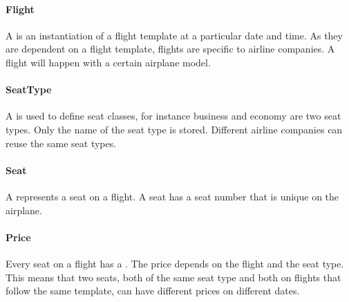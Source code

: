 \documentclass[a4paper]{article}
\begin{document}


\paragraph{Flight}
A  is an instantiation of a flight template at a particular date and time.
As they are dependent on a flight template, flights are specific to airline companies.
A flight will happen with a certain airplane model.
\paragraph{SeatType}
A  is used to define seat classes, for instance business and economy are two seat types.
Only the name of the seat type is stored.
Different airline companies can reuse the same seat types.
\paragraph{Seat}
A  represents a seat on a flight.
A seat has a seat number that is unique on the airplane.
\paragraph{Price}
Every seat on a flight has a .
The price depends on the flight and the seat type.
This means that two seats, both of the same seat type and both on flights that follow the same template, can have different prices on different dates.
\end{document}
